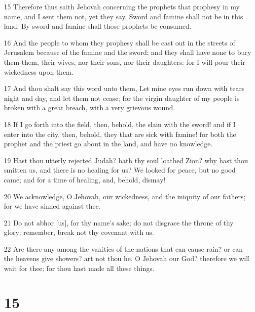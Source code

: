 \par 15 Therefore thus saith Jehovah concerning the prophets that prophesy in my name, and I sent them not, yet they say, Sword and famine shall not be in this land: By sword and famine shall those prophets be consumed.
\par 16 And the people to whom they prophesy shall be cast out in the streets of Jerusalem because of the famine and the sword; and they shall have none to bury them-them, their wives, nor their sons, nor their daughters: for I will pour their wickedness upon them.
\par 17 And thou shalt say this word unto them, Let mine eyes run down with tears night and day, and let them not cease; for the virgin daughter of my people is broken with a great breach, with a very grievous wound.
\par 18 If I go forth into the field, then, behold, the slain with the sword! and if I enter into the city, then, behold, they that are sick with famine! for both the prophet and the priest go about in the land, and have no knowledge.
\par 19 Hast thou utterly rejected Judah? hath thy soul loathed Zion? why hast thou smitten us, and there is no healing for us? We looked for peace, but no good came; and for a time of healing, and, behold, dismay!
\par 20 We acknowledge, O Jehovah, our wickedness, and the iniquity of our fathers; for we have sinned against thee.
\par 21 Do not abhor [us], for thy name's sake; do not disgrace the throne of thy glory: remember, break not thy covenant with us.
\par 22 Are there any among the vanities of the nations that can cause rain? or can the heavens give showers? art not thou he, O Jehovah our God? therefore we will wait for thee; for thou hast made all these things.

\chapter{15}

